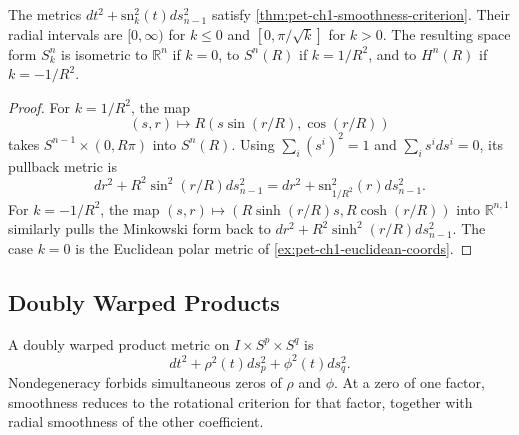 \begin{example}
  \label{ex:pet-ch1-space-forms}


  The metrics
  $dt^2+\mathrm{sn}_k^2(t)ds_{n-1}^2$ satisfy
  \cref{thm:pet-ch1-smoothness-criterion}. Their radial intervals are
  $[0,\infty)$ for $k\le0$ and $[0,\pi/\sqrt{k}]$ for $k>0$. The resulting
  space form $S_k^n$ is isometric to $\mathbb{R}^n$ if $k=0$, to $S^n(R)$ if
  $k=1/R^2$, and to $H^n(R)$ if $k=-1/R^2$.
\end{example}
\begin{proof}

  \sketch
  For $k=1/R^2$, the map
  \[
    (s,r)\longmapsto R(s\sin(r/R),\cos(r/R))
  \]
  takes $S^{n-1}\times(0,R\pi)$ into $S^n(R)$. Using
  $\sum_i(s^i)^2=1$ and $\sum_i s^i ds^i=0$, its pullback metric is
  \[
    dr^2+R^2\sin^2(r/R)ds_{n-1}^2
      =dr^2+\mathrm{sn}_{1/R^2}^2(r)ds_{n-1}^2.
  \]
  For $k=-1/R^2$, the map
  $(s,r)\mapsto(R\sinh(r/R)s,R\cosh(r/R))$ into $\mathbb{R}^{n,1}$ similarly
  pulls the Minkowski form back to
  $dr^2+R^2\sinh^2(r/R)ds_{n-1}^2$. The case $k=0$ is the Euclidean polar
  metric of \cref{ex:pet-ch1-euclidean-coords}.
\end{proof}

\subsection{Doubly Warped Products}

\begin{definition}
  \label{def:pet-ch1-doubly-warped}


  A doubly warped product metric on $I\times S^p\times S^q$ is
  \[
    dt^2+\rho^2(t)ds_p^2+\phi^2(t)ds_q^2.
  \]
  Nondegeneracy forbids simultaneous zeros of $\rho$ and $\phi$. At a zero of
  one factor, smoothness reduces to the rotational criterion for that factor,
  together with radial smoothness of the other coefficient.
\end{definition}

